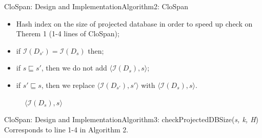 \documentclass[12pt]{beamer}
\begin{document}
\begin{frame}{CloSpan: Design and Implementation}{Algorithm2: CloSpan}
\begin{itemize}
\item Hash index on the size of projected database in order to speed up check on Therem 1 (1-4 lines of CloSpan);
\item if $\mathcal{I}(D_{s'}) = \mathcal{I}(D_s)$ then;
\item if $s \sqsubseteq s'$, then we do not add $\langle \mathcal{I}(D_s),s \rangle$;
\item if $s' \sqsubseteq s$, then we replace $\langle \mathcal{I}(D_{s'}),s' \rangle$ with $\langle \mathcal{I}(D_s),s \rangle$.
\end{itemize}
\begin{figure}
\caption*{$\langle \mathcal{I}(D_s),s \rangle$}
\end{figure}
\end{frame}

\begin{frame}{CloSpan: Design and Implementation}{Algorithm3: checkProjectedDBSize({\it s, k, H})}
Corresponds to line 1-4 in Algorithm 2.
\begin{figure}
\end{figure}
\end{frame}
\end{document}
